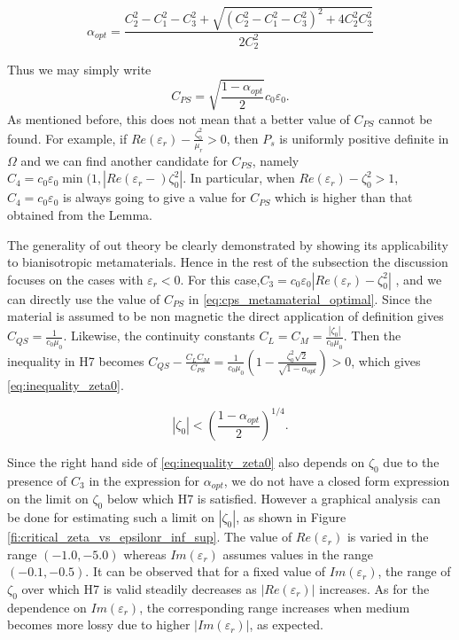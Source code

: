 \begin{equation}  \label{eq:alpha_opt}
\alpha_{opt} = \frac{C_2^2-C_1^2-C_3^2 + \sqrt{(C_2^2-C_1^2-C_3^2)^2+4C_2^2C_3^2}}{2C_2^2}
\end{equation}

Thus we may simply write 
\begin{equation} \label{eq:cps_metamaterial_optimal}
C_{PS} = \sqrt{\frac{1-\alpha_{opt}}{2}}c_0\varepsilon_0.
\end{equation}
As mentioned before, this does not mean that a better value of $C_{PS}$ 
cannot be found.
For example, if $Re(\varepsilon_r) -\frac{\zeta_0^2}{\mu_r} > 0$, 
then $P_s$ is uniformly positive definite in $\Omega$ and we can find 
another candidate for $C_{PS}$, namely $C_4 = c_0\varepsilon_0\min(1, |Re(\varepsilon_r-)\zeta_0^2|$.
In particular, when  $Re(\varepsilon_r) - \zeta_0^2 > 1$, $C_4 = c_0\varepsilon_0$ is always going to give a value for $C_{PS}$ which is higher than that obtained from the Lemma.

The generality of out theory be clearly demonstrated by showing its 
applicability to bianisotropic metamaterials. 
Hence in the rest of the subsection the discussion  focuses on 
the cases with $\varepsilon_r < 0$.
For this case,$C_3 = c_0\varepsilon_0 |Re(\varepsilon_r) -\zeta_0^2|$ , and we can directly use the value of $C_{PS}$ in \eqref{eq:cps_metamaterial_optimal}.
Since the material is assumed to be non magnetic the direct application of definition 
gives $C_{QS} = \frac{1}{c_0\mu_0}$.
Likewise, the continuity constants $C_L = C_M = \frac{|\zeta_0|}{c_0\mu_0}$.
Then the inequality in H7 becomes $C_{QS} -\frac{C_L C_M}{C_{PS}} = \frac{1}{c_0\mu_0}(1 -\frac{\zeta_0^2\sqrt{2}}{\sqrt{1-\alpha_{opt}}}) > 0$, 
which gives \eqref{eq:inequality_zeta0}.

\begin{equation} \label{eq:inequality_zeta0}
|\zeta_0| < \left(\frac{1 - \alpha_{opt}}{2}\right)^{1/4}.
\end{equation}

Since the right hand side of \eqref{eq:inequality_zeta0} also depends on 
$\zeta_0$ due to the presence of $C_3$ in the expression for $\alpha_{opt}$,
we do not have a closed form expression on the limit on $\zeta_0$ 
below which H7 is satisfied.
However a graphical analysis can be done for estimating such a limit 
on $|\zeta_0|$, as shown in 
Figure \ref{fi:critical_zeta_vs_epsilonr_inf_sup}.
The value of $Re(\varepsilon_r)$ is varied in the range $(-1.0,-5.0)$ 
whereas $Im(\varepsilon_r)$ assumes values in the range $(-0.1,-0.5)$.
It can be observed that for a fixed value of $Im(\varepsilon_r)$, 
the range of $\zeta_0$ over which H7 is valid steadily decreases as 
$|Re(\varepsilon_r)|$ increases. 
As for the dependence on $Im(\varepsilon_r)$, the corresponding range
increases when medium becomes more lossy due to higher $|Im(\varepsilon_r)|$,
as expected.

